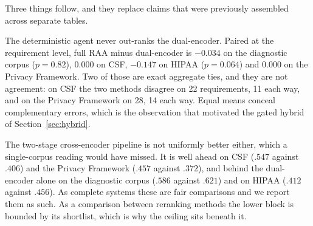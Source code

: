 \documentclass[smallextended,natbib]{svjour3}
\begin{document}
\begin{table}[htbp]
\caption{Top-1 accuracy for every method on all four corpora under the primary protocol: one scoring pass per requirement over the full control corpus, LSI fitted on controls only. The lower block reranks the dual-encoder's top 20 rather than the corpus, so it is bounded by that shortlist; its ceiling is given beneath it.}
\label{tab:unified}
\centering
\setlength{\tabcolsep}{3pt}
\small
{}
\end{table}

Three things follow, and they replace claims that were previously assembled across separate tables.

The deterministic agent never out-ranks the dual-encoder. Paired at the requirement level, full RAA minus dual-encoder is $-0.034$ on the diagnostic corpus ($p = 0.82$), $0.000$ on CSF, $-0.147$ on HIPAA ($p = 0.064$) and $0.000$ on the Privacy Framework. Two of those are exact aggregate ties, and they are not agreement: on CSF the two methods disagree on 22 requirements, 11 each way, and on the Privacy Framework on 28, 14 each way. Equal means conceal complementary errors, which is the observation that motivated the gated hybrid of Section~\ref{sec:hybrid}.

The two-stage cross-encoder pipeline is not uniformly better either, which a single-corpus reading would have missed. It is well ahead on CSF ($.547$ against $.406$) and the Privacy Framework ($.457$ against $.372$), and behind the dual-encoder alone on the diagnostic corpus ($.586$ against $.621$) and on HIPAA ($.412$ against $.456$). As complete systems these are fair comparisons and we report them as such. As a comparison between reranking methods the lower block is bounded by its shortlist, which is why the ceiling sits beneath it.
\end{document}
